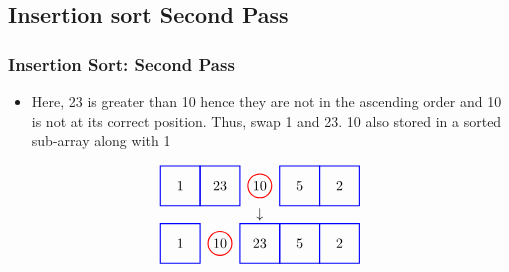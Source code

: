 \documentclass{beamer}
\begin{document}
\subsection{Insertion sort Second Pass}
\begin{frame}[c, fragile]
\frametitle{Insertion Sort: Second Pass}

\begin{itemize}
    \item Here, 23 is greater than 10 hence they are not in the ascending order and 10 is not at its correct position. Thus, swap 1 and 23. 10 also stored in a sorted sub-array along with 1
\end{itemize}

\[
\begin{array}{c}
\begin{tikzpicture}[baseline=(current bounding box.center)]
    \node at (0,0) {1};
    \node at (1,0) {23};
    \node at (2,0) {10};
    \node at (3,0) {5};
    \node at (4,0) {2};
    \draw[red, thick] (2,0) circle (0.3);
    \draw[blue, thick] (-0.5,-0.5) rectangle (0.5,0.5);
    \draw[blue, thick] (0.5,-0.5) rectangle (1.5,0.5);
    \draw[blue, thick] (2.5,-0.5) rectangle (3.5,0.5);
    \draw[blue, thick] (3.5,-0.5) rectangle (4.5,0.5);
\end{tikzpicture} \\
\downarrow \\
\begin{tikzpicture}[baseline=(current bounding box.center)]
    \node at (0,0) {1};
    \node at (1,0) {10};
    \node at (2,0) {23};
    \node at (3,0) {5};
    \node at (4,0) {2};
    \draw[red, thick] (1,0) circle (0.3);
    \draw[blue, thick] (-0.5,-0.5) rectangle (0.5,0.5);
    \draw[blue, thick] (1.5,-0.5) rectangle (2.5,0.5);
    \draw[blue, thick] (2.5,-0.5) rectangle (3.5,0.5);
    \draw[blue, thick] (3.5,-0.5) rectangle (4.5,0.5);
\end{tikzpicture}
\end{array}
\]
\end{frame}
\end{document}
